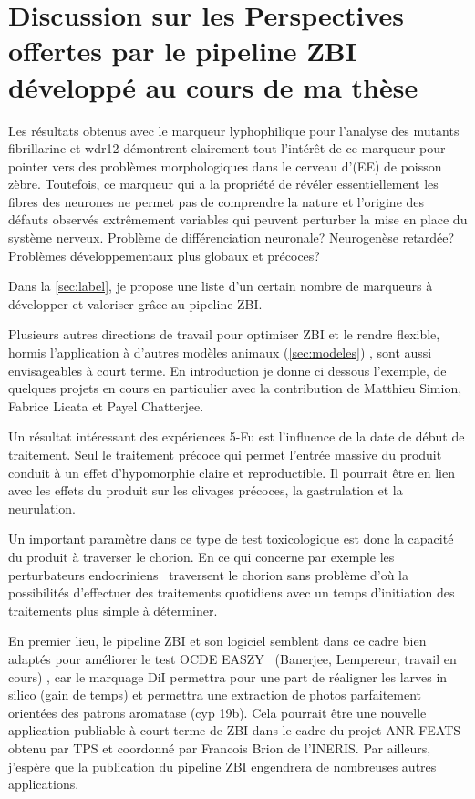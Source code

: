 \documentclass[\main/main.tex]{subfiles}
\begin{document}
\section{Discussion sur les Perspectives offertes par le pipeline ZBI développé au cours de ma thèse}
   
%
Les résultats obtenus avec le marqueur lyphophilique pour l'analyse des mutants fibrillarine et wdr12 démontrent clairement tout l'intérêt de ce marqueur pour pointer vers des problèmes morphologiques dans le cerveau d'\ee (EE) de poisson zèbre.
%
Toutefois, ce marqueur qui a la propriété de révéler essentiellement les fibres des neurones ne permet pas de comprendre la nature et l'origine des défauts observés extrêmement variables qui peuvent perturber la mise en place du système nerveux.
%
Problème de différenciation neuronale? Neurogenèse retardée? Problèmes développementaux plus globaux et précoces? 

%
Dans la \autoref{sec:label}, je propose une liste d'un certain nombre de marqueurs à développer et valoriser grâce au pipeline ZBI.

%
Plusieurs autres directions de travail pour optimiser ZBI et le rendre flexible, hormis l'application à d'autres modèles animaux (\autoref{sec:modeles}) , sont aussi envisageables à court terme. En introduction je donne ci dessous l'exemple, de quelques projets en cours en particulier avec la contribution de Matthieu Simion, Fabrice Licata et Payel Chatterjee. 

%
Un résultat intéressant des expériences 5-Fu est l'influence de la date de début de traitement.
%
Seul le traitement précoce qui permet l'entrée massive du produit conduit à un effet d'hypomorphie claire et reproductible. Il pourrait être en lien avec les  effets du produit sur les clivages précoces, la gastrulation et la neurulation.

%
Un important paramètre dans ce type de test toxicologique  est donc la capacité du produit à traverser le chorion. En ce qui concerne par exemple les perturbateurs endocriniens~\cite{brion_2012} traversent le chorion sans problème d'où la possibilités d'effectuer des traitements quotidiens avec un temps d'initiation des traitements  plus simple à déterminer.

En premier lieu, le pipeline ZBI et son logiciel semblent dans ce cadre  bien  adaptés pour améliorer le test OCDE EASZY~\cite{brion_2019} (Banerjee, Lempereur, travail en cours) , car le marquage DiI permettra pour une part de réaligner les larves in silico (gain de temps) et permettra une extraction de photos parfaitement orientées des patrons aromatase (cyp 19b). Cela pourrait être une nouvelle application publiable à court terme de ZBI dans le cadre du projet ANR FEATS obtenu par TPS et coordonné par Francois Brion de l'INERIS. Par ailleurs, j'espère que la publication du pipeline ZBI engendrera de nombreuses autres applications.
\end{document}

